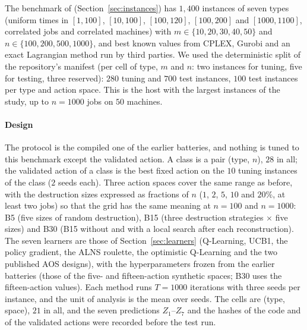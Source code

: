 The benchmark of \citet{FanjulPeyroRuiz2010} (Section~\ref{sec:instances}) has $1{,}400$ instances of seven types (uniform times in $[1,100]$, $[10,100]$, $[100,120]$, $[100,200]$ and $[1000,1100]$, correlated jobs and correlated machines) with $m\in\{10,20,30,40,50\}$ and $n\in\{100,200,500,1000\}$, and best known values from CPLEX, Gurobi and an exact Lagrangian method run by third parties. We used the deterministic split of the repository's manifest (per cell of type, $m$ and $n$: two instances for tuning, five for testing, three reserved): $280$ tuning and $700$ test instances, $100$ test instances per type and action space. This is the host with the largest instances of the study, up to $n=1000$ jobs on $50$ machines.

\paragraph{Design} The protocol is the compiled one of the earlier batteries, and nothing is tuned to this benchmark except the validated action. A class is a pair (type, $n$), $28$ in all; the validated action of a class is the best fixed action on the $10$ tuning instances of the class ($2$ seeds each). Three action spaces cover the same range as before, with the destruction sizes expressed as fractions of $n$ ($1$, $2$, $5$, $10$ and $20\%$, at least two jobs) so that the grid has the same meaning at $n=100$ and $n=1000$: B5 (five sizes of random destruction), B15 (three destruction strategies $\times$ five sizes) and B30 (B15 without and with a local search after each reconstruction). The seven learners are those of Section~\ref{sec:learners} (Q-Learning, UCB1, the policy gradient, the ALNS roulette, the optimistic Q-Learning and the two published AOS designs), with the hyperparameters frozen from the earlier batteries (those of the five- and fifteen-action synthetic spaces; B30 uses the fifteen-action values). Each method runs $T=1000$ iterations with three seeds per instance, and the unit of analysis is the mean over seeds. The cells are (type, space), $21$ in all, and the seven predictions $Z_1$--$Z_7$ and the hashes of the code and of the validated actions were recorded before the test run.

